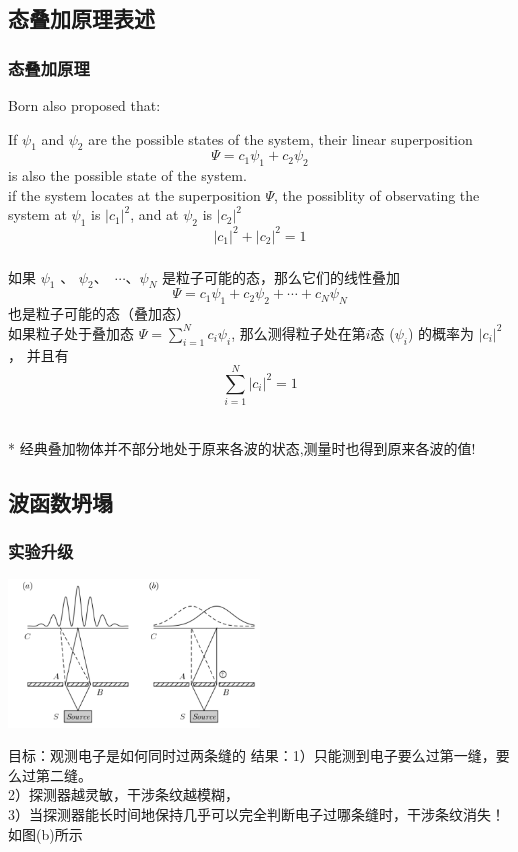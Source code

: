 \subsection{态叠加原理表述}

\begin{frame}
    \frametitle{态叠加原理}
    Born also proposed that: \\
    \begin{tcolorbox4}
    If $\psi_1$ and $\psi_2$ are the possible states of the system,
    their linear superposition \[ \Psi=c_1 \psi_1+ c_2\psi_2 \]
    is also the possible state of the system.\\
    if the system locates at the superposition $\Psi$, the possiblity of observating the system at $\psi_1$ is $|c_1|^2$, and at $\psi_2$ is $|c_2|^2$ \\
    \[|c_1 |^2 + |c_2 |^2 =1\]
    \end{tcolorbox4}
\end{frame}

\begin{frame}
    \frametitle{}
    \begin{tcolorbox4}[态叠加原理中文表述]
    如果 $\psi_1$ 、 $\psi_2$、 $\cdots$、$\psi_N$ 是粒子可能的态，那么它们的线性叠加
        $$ \Psi=c_1 \psi_1+ c_2\psi_2+\cdots+c_N\psi_N $$
    也是粒子可能的态（叠加态）\\   
    如果粒子处于叠加态 $\Psi=\sum\limits_{i=1}^N c_i \psi_i$,  
    那么测得粒子处在第$i$态 ($\psi_i$) 的概率为 $|c_i |^2$， 
    并且有  $$\sum_{i=1}^{N} |c_i|^2 =1$$
    \end{tcolorbox4}
    ~~\\ 
    * 经典叠加物体并不部分地处于原来各波的状态,测量时也得到原来各波的值!
\end{frame}

\subsection{波函数坍塌}

\begin{frame}
    \frametitle{实验升级}
    \begin{center}
        \includegraphics[width=0.5\textwidth]{figs/sup-4.png} \\
    \end{center} 
    \begin{itemize}
        \Item 目标：观测电子是如何同时过两条缝的
        \Item 结果：1）只能测到电子要么过第一缝，要么过第二缝。\\
        2）探测器越灵敏，干涉条纹越模糊，\\
        3）当探测器能长时间地保持几乎可以完全判断电子过哪条缝时，干涉条纹消失！如图(b)所示
    \end{itemize}
\end{frame}

